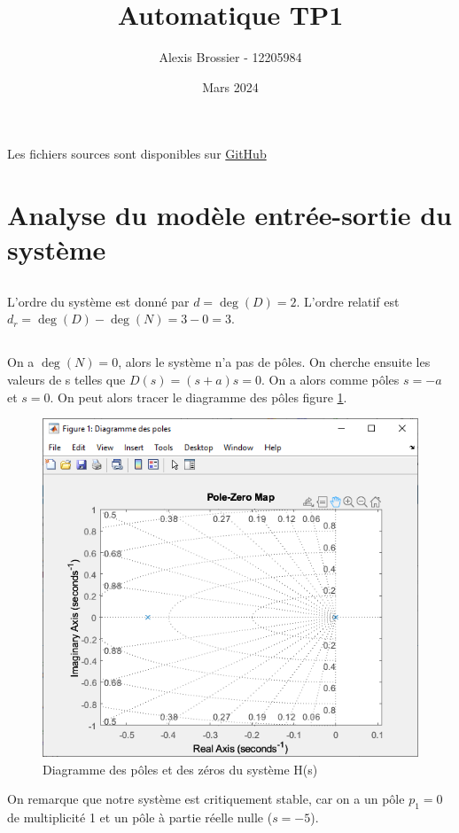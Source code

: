 \documentclass{article}
\title{Automatique TP1}
\author{Alexis Brossier - 12205984}
\date{Mars 2024}
\begin{document}
\maketitle

Les fichiers sources sont disponibles sur \href{https://github.com/AL3X-69/GEP2014L/blob/master/tp1.m}{GitHub}

\section{Analyse du modèle entrée-sortie du système}
\subsection{}
L'ordre du système est donné par $d=\deg(D)=2$. L'ordre relatif est $d_r=\deg(D)-\deg(N)=3-0=3$.
\subsection{}
On a $\deg(N)=0$, alors le système n'a pas de pôles. On cherche ensuite les valeurs de s telles que $D(s)=(s+a)s=0$. On a alors comme pôles $s=-a$ et $s=0$. On peut alors tracer le diagramme des pôles figure \ref{fig:pzmap112}.
\begin{figure}[h]
    \centering
    \includegraphics[width=0.5\linewidth]{pzmap112.PNG}
    \caption{Diagramme des pôles et des zéros du système H(s)}
    \label{fig:pzmap112}
\end{figure}
On remarque que notre système est critiquement stable, car on a un pôle $p_1=0$ de multiplicité 1 et un pôle à partie réelle nulle ($s=-5$).
\end{document}
